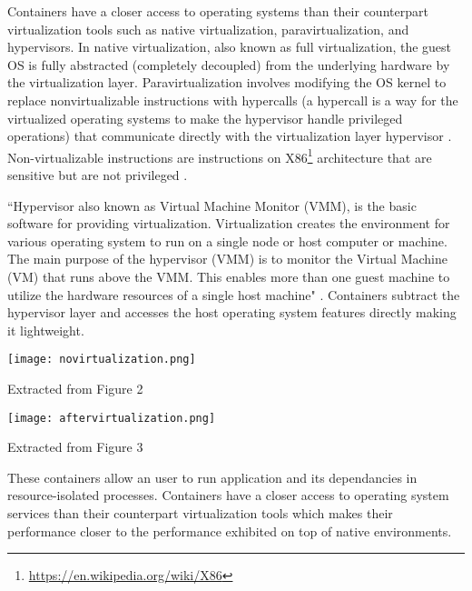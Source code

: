Containers have a closer access to operating systems than their counterpart virtualization tools such as native virtualization, paravirtualization, and hypervisors. In native virtualization, also known as full virtualization, the guest OS is fully abstracted (completely decoupled) from the underlying hardware by the virtualization layer. Paravirtualization involves modifying the OS kernel to replace nonvirtualizable instructions with hypercalls (a hypercall is a way for the virtualized operating systems to make the hypervisor handle privileged operations) that communicate directly with the virtualization layer hypervisor \cite{citeulike:11530382}. Non-virtualizable instructions are instructions on X86\footnote{\url{https://en.wikipedia.org/wiki/X86}} architecture that are sensitive but are not privileged \cite{non-virtualizable-commands}. 

``Hypervisor also known as Virtual Machine Monitor (VMM), is the basic software for providing virtualization. Virtualization creates the environment for various operating system to run on a single node or host computer or machine. The main purpose of the hypervisor (VMM) is to monitor the Virtual Machine (VM) that runs above the VMM. This enables more than one guest machine to utilize the hardware resources of a single host machine" \cite{hypervisor}. Containers subtract the hypervisor layer and accesses the host operating system features directly making it lightweight.\\

\begin{center}
\begin{minipage}{0.48\linewidth}
\texttt{[image: novirtualization.png]}
\label{fig:novirtualization}
\caption*{Extracted from \cite{10.4236/ijcns.2015.87026} Figure 2}
\end{minipage}%
\hfill
\begin{minipage}{0.48\linewidth}
\texttt{[image: aftervirtualization.png]}
\label{fig:aftervirtualization}
\caption*{Extracted from \cite{10.4236/ijcns.2015.87026} Figure 3}
\end{minipage}
\end{center}

These containers allow an user to run application and its dependancies in resource-isolated processes. Containers have a closer access to operating system services than their counterpart virtualization tools which makes their performance closer to the performance exhibited on top of native environments\cite{Xavier:2013:PEC:2497369.2497577}.\\

